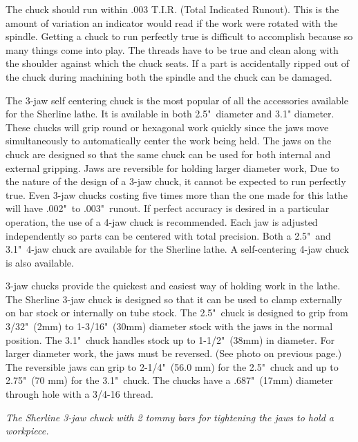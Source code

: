 
The chuck should run within .003 T.I.R. (Total Indicated Runout). This is the
amount of variation an indicator would read if the work were rotated with the
spindle. Getting a chuck to run perfectly true is difficult to accomplish
because so many things come into play. The threads have to be true and clean
along with the shoulder against which the chuck seats. If a part is accidentally
ripped out of the chuck during machining both the spindle and the chuck can be
damaged.


The 3-jaw self centering chuck is the most popular of all the accessories
available for the Sherline lathe. It is available in both 2.5"\ diameter and 3.1"
diameter. These chucks will grip round or hexagonal work quickly since the jaws
move simultaneously to automatically center the work being held. The jaws on the
chuck are designed so that the same chuck can be used for both internal and
external gripping. Jaws are reversible for holding larger diameter work, Due to
the nature of the design of a 3-jaw chuck, it cannot be expected to run
perfectly true. Even 3-jaw chucks costing five times more than the one made for
this lathe will have .002"\ to .003"\ runout. If perfect accuracy is desired in a
particular operation, the use of a 4-jaw chuck is recommended. Each jaw is
adjusted independently so parts can be centered with total precision. Both a
2.5"\ and 3.1"\ 4-jaw chuck are available for the Sherline lathe. A self-centering
4-jaw chuck is also available.


3-jaw chucks provide the quickest and easiest way of holding work in the lathe.
The Sherline 3-jaw chuck is designed so that it can be used to clamp externally
on bar stock or internally on tube stock. The 2.5"\ chuck is designed to grip
from 3/32"\ (2mm) to 1-3/16"\ (30mm) diameter stock with the jaws in the normal
position. The 3.1"\ chuck handles stock up to 1-1/2"\ (38mm) in diameter. For
larger diameter work, the jaws must be reversed. (See photo on previous page.)
The reversible jaws can grip to 2-1/4"\ (56.0 mm) for the 2.5"\ chuck and up to
2.75"\ (70 mm) for the 3.1"\ chuck. The chucks have a .687"\ (17mm) diameter
through hole with a 3/4-16 thread.

\bigskip
\textit{The Sherline 3-jaw chuck with 2 tommy bars for tightening the jaws to
hold a workpiece.}
\bigskip

